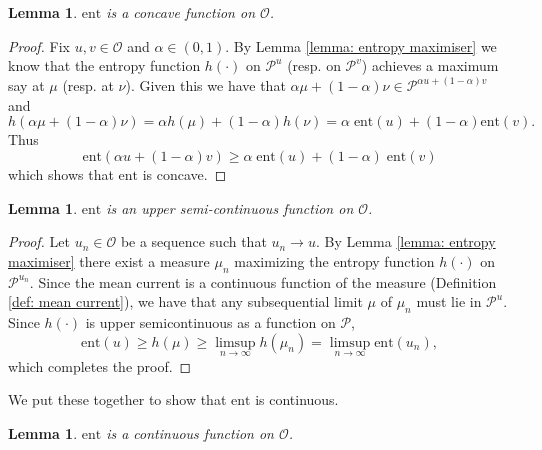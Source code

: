 \documentclass[11pt]{article}
\newtheorem{lemma}[thm]{Lemma}
\theoremstyle{remark}
\theoremstyle{definition}
\newcommand{\Prob}{\mathcal P}
\newcommand{\ent}{\text{ent}}
\newcommand{\mc}[1]{\mathcal{#1}}
\begin{document}
\begin{lemma}\label{lemma: entropy_concave}
	$\text{ent}$ is a concave function on $\mc O$. 
\end{lemma}
\begin{proof}
	Fix $u, v\in \mathcal O$ and $\alpha\in (0,1)$. By Lemma \ref{lemma: entropy maximiser} we know that the entropy function $h(\cdot)$ on $\mathcal P^{u}$ (resp. on $\mathcal P^{v}$) achieves a maximum say at $\mu$ (resp. at $\nu$). Given this we have that $\alpha \mu +(1-\alpha) \nu \in \mathcal P^{\alpha u+ (1-\alpha)v}$ and 
	$$h({\alpha \mu +(1-\alpha) \nu}) =\alpha h({\mu}) + (1-\alpha)h({\nu})=\alpha \; \text{ent}(u) + (1-\alpha) \text{ent}(v) .$$
	Thus 
	$$\text{ent}(\alpha u +(1-\alpha) v)\geq \alpha\; \text{ent}(u) + (1-\alpha)\; \text{ent}(v)$$
	which shows that $\text{ent}$ is concave.
\end{proof}

\begin{lemma}\label{lem:ent_upper_semi_cont}
	$\text{ent}$ is an upper semi-continuous function on $\mc O$.
\end{lemma}

\begin{proof}
	Let $u_n\in \mathcal O$ be a sequence such that $u_n\to  u$. By Lemma \ref{lemma: entropy maximiser} there exist a measure $\mu_n$ maximizing the entropy function $h(\cdot)$ on $\Prob^{u_n}$. Since the mean current is a continuous function of the measure (Definition \ref{def: mean current}), we have that any subsequential limit $\mu$ of $\mu_n$ must lie in $\Prob^{u}$. Since $h(\cdot)$ is upper semicontinuous as a function on $\mc P$,
	$$\text{ent}(u)\geq h(\mu)\geq \limsup_{n \to \infty} h({\mu_n})= \limsup_{n\to \infty} \text{ent}(u_n),$$
which completes the proof.
\end{proof}

We put these together to show that $\ent$ is continuous.

\begin{lemma}\label{lemma: entropy_continuous}
	$\text{ent}$ is a continuous function on $\mc O$.
\end{lemma}
\end{document}
